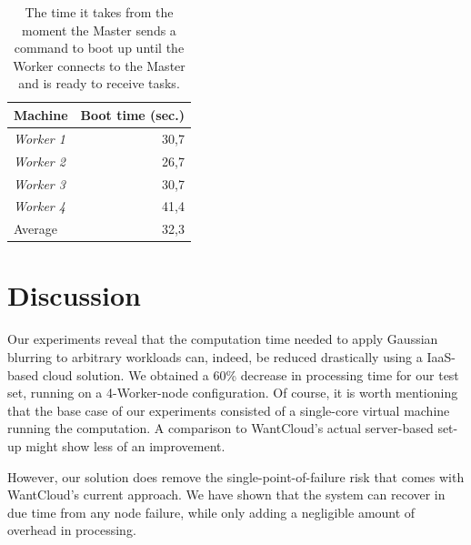 \documentclass{acm_proc_article-sp}
\begin{document}
\begin{table}
	\centering
	\begin{tabular}{| l | r |}
		\hline
		Machine & Boot time (sec.) \\ \hline \hline
		\emph{Worker 1} & 30,7 \\ \hline
		\emph{Worker 2} & 26,7 \\ \hline
		\emph{Worker 3} & 30,7 \\ \hline
		\emph{Worker 4} & 41,4 \\ \hline \hline
		Average & 32,3 \\ \hline
	\end{tabular}
	\caption{The time it takes from the moment the Master sends a command to boot up until the Worker connects to the Master and is ready to receive tasks.}
	\label{tbl:boottimes}
\end{table}


\section{Discussion}
\label{sec:discussion}

Our experiments reveal that the computation time needed to apply Gaussian blurring to arbitrary workloads can, indeed, be reduced drastically using a IaaS-based cloud solution. 
We obtained a 60\% decrease in processing time for our test set, running on a 4-Worker-node configuration. 
Of course, it is worth mentioning that the base case of our experiments consisted of a single-core virtual machine running the computation. 
A comparison to WantCloud's actual server-based set-up might show less of an improvement.

However, our solution does remove the single-point-of-failure risk that comes with WantCloud's current approach.
We have shown that the system can recover in due time from any node failure, while only adding a negligible amount of overhead in processing.
\end{document}
